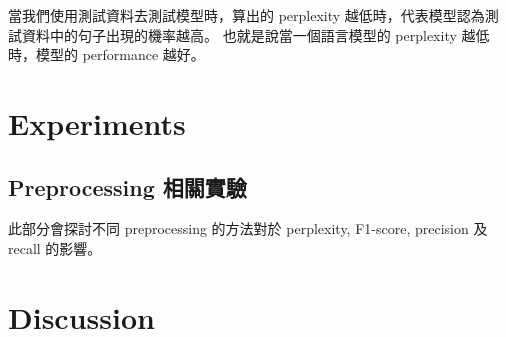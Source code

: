 \documentclass{article}[12pt]
\begin{document}
當我們使用測試資料去測試模型時，算出的 perplexity 越低時，代表模型認為測試資料中的句子出現的機率越高。
也就是說當一個語言模型的 perplexity 越低時，模型的 performance 越好。

\section{Experiments}

\subsection{Preprocessing 相關實驗}
此部分會探討不同 preprocessing 的方法對於 perplexity, F1-score, precision 及 recall
的影響。



\section{Discussion}
\subsection{}
\end{document}
